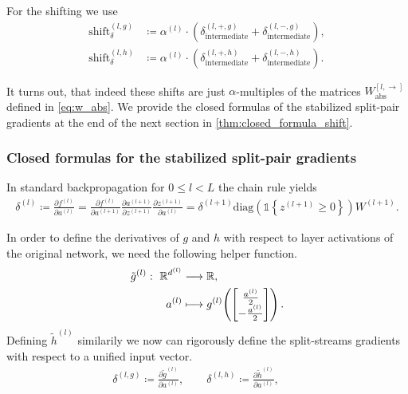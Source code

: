 For the shifting we use
\begin{align}
    \text{shift}_\delta^{(l, g)} & \coloneqq \alpha^{(l)} \cdot \left( \delta_{\text{intermediate}}^{(l, +, g)} + \delta_{\text{intermediate}}^{(l, -, g)} \right), \\
    \text{shift}_\delta^{(l, h)} & \coloneqq \alpha^{(l)} \cdot \left( \delta_{\text{intermediate}}^{(l, +, h)} + \delta_{\text{intermediate}}^{(l, -, h)} \right).
\end{align}

It turns out, that indeed these shifts are just $\alpha$-multiples of the matrices $W_{\text{abs}}^{[l, \rightarrow]}$ defined in \cref{eq:w_abs}.
We provide the closed formulas of the stabilized split-pair gradients at the end of the next section in \cref{thm:closed_formula_shift}.

\subsubsection{Closed formulas for the stabilized split-pair gradients}

In standard backpropagation for $0 \leq l < L$ the chain rule yields
\begin{align}
    \delta^{(l)}
        \coloneqq \frac{\partial f^{(l)}}{\partial a^{(l)}}
        = \frac{\partial f^{(l)}}{\partial a^{(l+1)}} \frac{\partial a^{(l+1)}}{\partial z^{(l+1)}} \frac{\partial z^{(l+1)}}{\partial a^{(l)}}
        = \delta^{(l+1)} \text{diag} \left( \mathbb{1}\left\{ z^{(l+1)} \geq 0 \right\} \right) W^{(l+1)}. \label{eq:std_bckprop}
\end{align}

In order to define the derivatives of $g$ and $h$ with respect to layer activations of the original network, we need the following helper function.
\begin{align}
    \tilde{g}^{(l)} :\ \mathbb{R}^{d^{(l)}} &\longrightarrow \mathbb{R}, \\
     a^{(l)} &\longmapsto g^{(l)}\!\left( \begin{bmatrix} \frac{a^{(l)}}{2} \\ -\frac{a^{(l)}}{2} \end{bmatrix} \right).
\end{align}
Defining $\tilde{h}^{(l)}$ similarily we now can rigorously define the split-streams gradients with respect to a unified input vector.
\begin{align}
    \delta^{(l, g)} \coloneqq \frac{\partial \tilde{g}^{(l)}}{\partial a^{(l)}}, \qquad
    \delta^{(l, h)} \coloneqq \frac{\partial \tilde{h}^{(l)}}{\partial a^{(l)}}, \qquad
\end{align}

